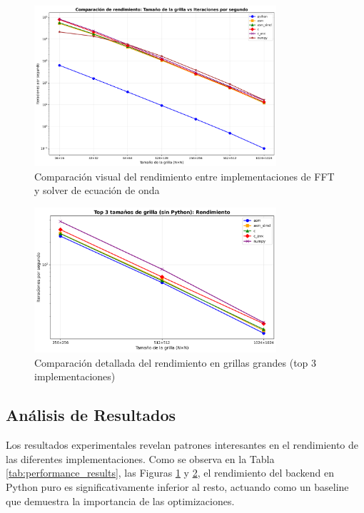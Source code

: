 \documentclass[a4paper]{article}
\begin{document}
\begin{figure}[h]
    \centering
    \includegraphics[width=0.8\textwidth]{extra/steps_per_second.png}
    \caption{Comparación visual del rendimiento entre implementaciones de FFT y solver de ecuación de onda}
    \label{fig:performance}
\end{figure}

\begin{figure}[h]
    \centering
    \includegraphics[width=0.8\textwidth]{extra/steps_per_second_top3.png}
    \caption{Comparación detallada del rendimiento en grillas grandes (top 3 implementaciones)}
    \label{fig:performance_top3}
\end{figure}

\subsection{Análisis de Resultados}

Los resultados experimentales revelan patrones interesantes en el rendimiento de las diferentes implementaciones. Como se observa en la Tabla \ref{tab:performance_results}, las Figuras \ref{fig:performance} y \ref{fig:performance_top3}, el rendimiento del backend en Python puro es significativamente inferior al resto, actuando como un baseline que demuestra la importancia de las optimizaciones.
\end{document}
